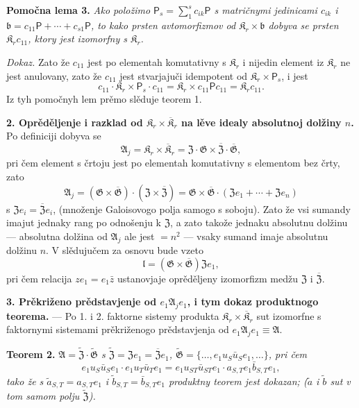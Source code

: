 \documentclass[11pt]{article}
\begin{document}
\noindent\textbf{Pomočna lema 3.} \emph{Ako položimo \(\mathsf{P}_s=\sum_1^s c_{ik}\mathsf{P}\) s matričnymi jedinicami \(c_{ik}\) i \(\mathfrak b=c_{11}\mathsf{P}+\cdots+c_{s1}\mathsf{P}\), to kako prsten avtomorfizmov od \(\mathfrak K_r\times\mathfrak b\) dobyva se prsten \(\mathfrak K_rc_{11}\), ktory jest izomorfny s \(\mathfrak K_r\).}

\noindent\emph{Dokaz.} Zato že \(c_{11}\) jest po elementah komutativny s \(\mathfrak K_r\) i nijedin element iz \(\mathfrak K_r\) ne jest anulovany, zato že \(c_{11}\) jest stvarjajuči idempotent od \(\mathfrak K_r\times \mathsf{P}_s\), i jest
\[
c_{11}\cdot\mathfrak K_r\times \mathsf{P}_s\cdot c_{11}
=\mathfrak K_r\times c_{11}\mathsf Pc_{11}
=\mathfrak K_rc_{11}.
\]
Iz tyh pomočnyh lem prěmo slěduje teorem 1.

\noindent\textbf{2. Oprěděljenje i razklad od \(\mathfrak K_r\times\overline{\mathfrak K}_r\) na lěve idealy absolutnoj dolžiny \(n\).} Po definiciji dobyva se
\[
\mathfrak A_j=\mathfrak K_r\times\overline{\mathfrak K}_r
=\mathfrak Z\cdot\mathfrak G\times\overline{\mathfrak Z}\cdot\overline{\mathfrak G},
\]
pri čem element s črtoju jest po elementah komutativny s elementom bez črty, zato
\[
\mathfrak A_j
=(\mathfrak G\times\overline{\mathfrak G})\cdot(\mathfrak Z\times\overline{\mathfrak Z})
=\mathfrak G\times\overline{\mathfrak G}\cdot(\mathfrak Ze_1+\cdots+\mathfrak Ze_n)
\]
s \(\mathfrak Ze_i=\overline{\mathfrak Z}e_i\), (množenje Galoisovogo polja samogo s soboju). Zato že vsi sumandy imajut jednaky rang po odnošenju k \(\mathfrak Z\), a zato takože jednaku absolutnu dolžinu --- absolutna dolžina od \(\mathfrak A_j\) ale jest \(=n^2\) --- vsaky sumand imaje absolutnu dolžinu \(n\). V slědujučem za osnovu bude vzeto
\[
\mathfrak l=(\mathfrak G\times\overline{\mathfrak G})\mathfrak Ze_1,
\]
pri čem relacija \(ze_1=e_1\bar z\) ustanovjaje oprěděljeny izomorfizm medžu \(\mathfrak Z\) i \(\overline{\mathfrak Z}\).

\noindent\textbf{3. Prěkriženo prědstavjenje od \(e_1\mathfrak A_je_1\), i tym dokaz produktnogo teorema.} --- Po 1. i 2. faktorne sistemy produkta \(\mathfrak K_r\times\overline{\mathfrak K}_r\) sut izomorfne s faktornymi sistemami prěkriženogo prědstavjenja od \(e_1\mathfrak A_je_1\equiv\mathfrak A\).

\noindent\textbf{Teorem 2.} \emph{\(\mathfrak A=\widetilde{\mathfrak Z}\cdot\widetilde{\mathfrak G}\) s \(\widetilde{\mathfrak Z}=\mathfrak Ze_1=\overline{\mathfrak Z}e_1\), \(\widetilde{\mathfrak G}=\{\ldots,e_1u_S\bar u_Se_1,\ldots\}\), pri čem
\[
e_1u_S\bar u_Se_1\cdot e_1u_T\bar u_Te_1
=e_1u_{ST}\bar u_{ST}e_1\cdot a_{S,T}e_1\bar b_{S,T}e_1,
\]
tako že s \(\tilde a_{S,T}=a_{S,T}e_1\) i \(\tilde b_{S,T}=\bar b_{S,T}e_1\) produktny teorem jest dokazan; (\(\tilde a\) i \(\tilde b\) sut v tom samom polju \(\widetilde{\mathfrak Z}\)).}
\end{document}
